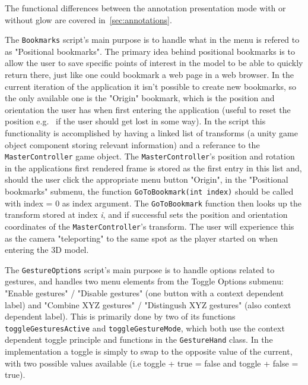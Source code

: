 The functional differences between the annotation presentation mode with or without glow are covered in~\vref{sec:annotations}. 

The \texttt{Bookmarks} script's main purpose is to handle what in the menu is refered to as "Positional bookmarks". The primary idea behind positional bookmarks 
is to allow the user to save specific points of interest in the model to be able to quickly return there, just like one could bookmark a web page in a web browser. 
In the current iteration of the application it isn't possible to create new bookmarks, so the only available one is the "Origin" bookmark, which is the position and orientation
the user has when first entering the application (useful to reset the position e.g.~ if the user should get lost in some way). In the script this functionality is accomplished
by having a linked list of transforms (a unity game object component storing relevant information) and a referance to the \texttt{MasterController} game object. 
The \texttt{MasterController}'s position and rotation in the applications first rendered frame is stored as the first entry in this list and, should the user click the 
appropriate menu button "Origin", in the "Positional bookmarks" submenu, the function \texttt{GoToBookmark(int index)} should be called with index = 0 as index argument. 
The \texttt{GoToBookmark} function then looks up the transform stored at index \textit{i}, and if successful sets the position and orientation coordinates of the 
\texttt{MasterController}'s transform. The user will experience this as the camera "teleporting" to the same spot as the player started on when entering the 3D model.

The \texttt{GestureOptions} script's main purpose is to handle options related to gestures, and handles two menu elements from the Toggle Options submenu:
"Enable gestures" / "Disable gestures" (one button with a context dependent label) and "Combine XYZ gestures" / "Distingush XYZ gestures" (also context dependent label). This is 
primarily done by two of its functions \texttt{toggleGesturesActive} and \texttt{toggleGestureMode}, which both use the context dependent toggle principle 
and functions in the \texttt{GestureHand} class. In the implementation a toggle is simply to swap to the opposite value of the current, with two possible values available (i.e 
toggle + true = false and toggle + false = true).


